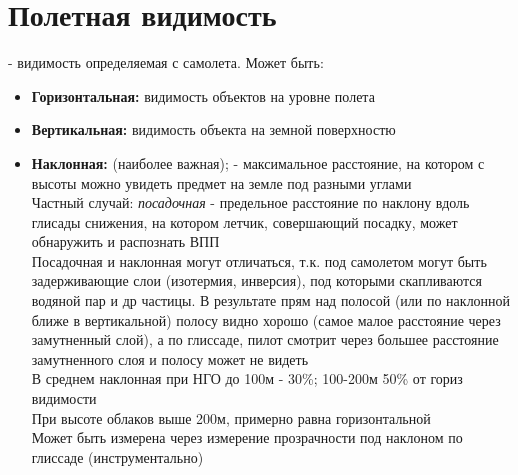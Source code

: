 
\section{Полетная видимость}
- видимость определяемая с самолета. Может быть:
\begin{itemize}
	\item \textbf{Горизонтальная:} видимость объектов на уровне полета
	\item \textbf{Вертикальная:} видимость объекта на земной поверхностю
	\item \textbf{Наклонная:} (наиболее важная); - максимальное расстояние, на котором с высоты можно увидеть предмет на земле под разными углами\\ 
	Частный случай: \textit{посадочная} - предельное расстояние по наклону вдоль глисады снижения, на котором летчик, совершающий посадку, может обнаружить и распознать ВПП\\
	
	Посадочная и наклонная могут отличаться, т.к. под самолетом могут быть задерживающие слои (изотермия, инверсия), под которыми скапливаются водяной пар и др частицы. 
	В результате прям над полосой (или по наклонной ближе в вертикальной) полосу видно хорошо (самое малое расстояние через замутненный слой), а по глиссаде, пилот смотрит через большее расстояние замутненного слоя и полосу может не видеть\\
	В среднем наклонная при НГО до 100м - 30\%; 100-200м 50\% от гориз видимости\\
	При высоте облаков выше 200м, примерно равна горизонтальной\\
	Может быть измерена через измерение прозрачности под наклоном по глиссаде (инструментально)
\end{itemize}